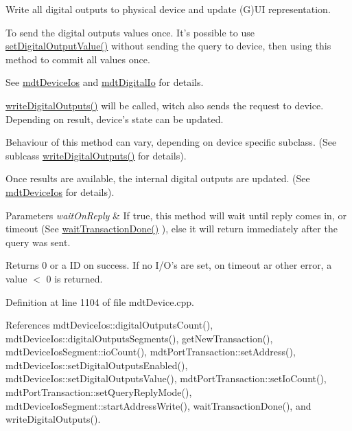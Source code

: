Write all digital outputs to physical device and update (G)U\-I representation. 

To send the digital outputs values once. It's possible to use \hyperlink{classmdt_device_a04564fd9be440c026e7c399f0e619485}{set\-Digital\-Output\-Value()} without sending the query to device, then using this method to commit all values once.

See \hyperlink{classmdt_device_ios}{mdt\-Device\-Ios} and \hyperlink{classmdt_digital_io}{mdt\-Digital\-Io} for details.

\hyperlink{classmdt_device_ae644ab1ef0ebb57d6d9d502829907ec1}{write\-Digital\-Outputs()} will be called, witch also sends the request to device. Depending on result, device's state can be updated.

Behaviour of this method can vary, depending on device specific subclass. (See sublcass \hyperlink{classmdt_device_ae644ab1ef0ebb57d6d9d502829907ec1}{write\-Digital\-Outputs()} for details).

Once results are available, the internal digital outputs are updated. (See \hyperlink{classmdt_device_ios}{mdt\-Device\-Ios} for details).


\begin{DoxyParams}{Parameters}
{\em wait\-On\-Reply} & If true, this method will wait until reply comes in, or timeout (See \hyperlink{classmdt_device_ab937015c1a319b7234442a4cc29a02a8}{wait\-Transaction\-Done()} ), else it will return immediately after the query was sent. \\
\hline
\end{DoxyParams}
\begin{DoxyReturn}{Returns}
0 or a I\-D on success. If no I/\-O's are set, on timeout ar other error, a value $<$ 0 is returned. 
\end{DoxyReturn}


Definition at line 1104 of file mdt\-Device.\-cpp.



References mdt\-Device\-Ios\-::digital\-Outputs\-Count(), mdt\-Device\-Ios\-::digital\-Outputs\-Segments(), get\-New\-Transaction(), mdt\-Device\-Ios\-Segment\-::io\-Count(), mdt\-Port\-Transaction\-::set\-Address(), mdt\-Device\-Ios\-::set\-Digital\-Outputs\-Enabled(), mdt\-Device\-Ios\-::set\-Digital\-Outputs\-Value(), mdt\-Port\-Transaction\-::set\-Io\-Count(), mdt\-Port\-Transaction\-::set\-Query\-Reply\-Mode(), mdt\-Device\-Ios\-Segment\-::start\-Address\-Write(), wait\-Transaction\-Done(), and write\-Digital\-Outputs().

